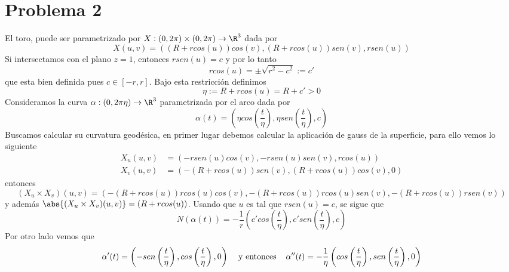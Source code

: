\documentclass{article}
\begin{document}
\section*{Problema 2}
\noindent El toro, puede ser parametrizado por $X:(0,2\pi)\times(0,2\pi)\to\R^{3}$ dada por
\begin{equation*}
    X(u,v)=((R+rcos(u))cos(v),(R+rcos(u))sen(v),rsen(u))
\end{equation*}
Si intersectamos con el plano $z=1$, entonces $rsen(u)=c$ y por lo tanto
\begin{equation*}
    rcos(u)=\pm\sqrt{r^{2}-c^{2}}:=c'
\end{equation*}
que esta bien definida pues $c\in[-r,r]$. Bajo esta restricción definimos
\begin{equation*}
    \eta:=R+rcos(u)=R+c'>0
\end{equation*}
Consideramos la curva $\alpha:(0,2\pi\eta)\to\R^{3}$ parametrizada por el arco dada por
\begin{equation*}
    \alpha(t)=\left(\eta cos\left(\frac{t}{\eta}\right),\eta sen\left(\frac{t}{\eta}\right),
    c\right)
\end{equation*}
Buscamos calcular su curvatura geodésica, en primer lugar debemos calcular la aplicación de gauss
de la superficie, para ello vemos lo siguiente
\begin{align*}
    X_{u}(u,v) &= (-rsen(u)cos(v),-rsen(u)sen(v),rcos(u)) \\
    X_{v}(u,v) &= (-(R+rcos(u))sen(v),(R+rcos(u))cos(v),0)
\end{align*}
entonces
\begin{equation*}
    (X_{u}\times X_{v})(u,v)=(-(R+rcos(u))rcos(u)cos(v),-(R+rcos(u))rcos(u)sen(v),
    -(R+rcos(u))rsen(v))
\end{equation*}
y además $\abs{(X_{u}\times X_{v})(u,v)}=(R+rcos(u))$. Usando que $u$ es tal que $rsen(u)=c$, se
sigue que
\begin{equation*}
    N(\alpha(t))=-\frac{1}{r}\left(c'cos\left(\frac{t}{\eta}\right),
    c'sen\left(\frac{t}{\eta}\right),c\right)
\end{equation*}
Por otro lado vemos que
\begin{equation*}
    \alpha'(t)=\left(-sen\left(\frac{t}{\eta}\right),cos\left(\frac{t}{\eta}\right),0\right)
    \hspace{4mm}\text{y entonces}\hspace{4mm}
    \alpha''(t)=-\frac{1}{\eta}\left(cos\left(\frac{t}{\eta}\right),
    sen\left(\frac{t}{\eta}\right),0\right)
\end{equation*}
\end{document}
